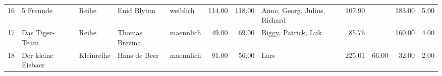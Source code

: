 \begin{table}
\begin{center}
{\begin{tabular}{rllllrrlrrrr}
  16 & 5 Freunde                                                                                                                                                                                                                                                       & Reihe & Enid Blyton                                                                                                                                                                                                                                                     & weiblich & 114.00 & 118.00 & Anne, Georg, Julius, Richard                                                                                                                                                                                                                                    & 107.90 &  & 183.00 & 5.00 \\ 
  17 & Das Tiger- Team                                                                                                                                                                                                                                                 & Reihe & Thomas Brezina                                                                                                                                                                                                                                                  & maennlich & 49.00 & 69.00 & Biggy, Patrick, Luk                                                                                                                                                                                                                                             & 85.76 &  & 160.00 & 4.00 \\ 
  18 & Der kleine Eisbaer                                                                                                                                                                                                                                              & Kleinreihe & Hans de Beer                                                                                                                                                                                                                                                    & maennlich & 91.00 & 56.00 & Lars                                                                                                                                                                                                                                                            & 225.01 & 66.00 & 32.00 & 2.00 \\ 

\end{tabular}}
\end{center}
\end{table}
